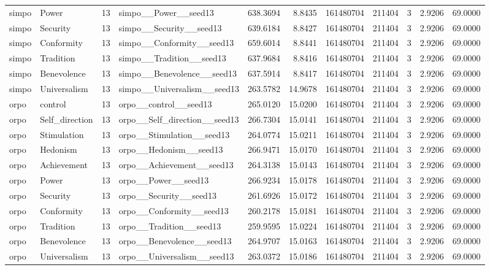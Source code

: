 \begin{tabular}{llrlrrrrrrr}
simpo & Power & 13 & simpo\_\_Power\_\_seed13 & 638.3694 & 8.8435 & 161480704 & 211404 & 3 & 2.9206 & 69.0000 \\
simpo & Security & 13 & simpo\_\_Security\_\_seed13 & 639.6184 & 8.8427 & 161480704 & 211404 & 3 & 2.9206 & 69.0000 \\
simpo & Conformity & 13 & simpo\_\_Conformity\_\_seed13 & 659.6014 & 8.8441 & 161480704 & 211404 & 3 & 2.9206 & 69.0000 \\
simpo & Tradition & 13 & simpo\_\_Tradition\_\_seed13 & 637.9684 & 8.8416 & 161480704 & 211404 & 3 & 2.9206 & 69.0000 \\
simpo & Benevolence & 13 & simpo\_\_Benevolence\_\_seed13 & 637.5914 & 8.8417 & 161480704 & 211404 & 3 & 2.9206 & 69.0000 \\
simpo & Universalism & 13 & simpo\_\_Universalism\_\_seed13 & 263.5782 & 14.9678 & 161480704 & 211404 & 3 & 2.9206 & 69.0000 \\
orpo & control & 13 & orpo\_\_control\_\_seed13 & 265.0120 & 15.0200 & 161480704 & 211404 & 3 & 2.9206 & 69.0000 \\
orpo & Self\_direction & 13 & orpo\_\_Self\_direction\_\_seed13 & 266.7304 & 15.0141 & 161480704 & 211404 & 3 & 2.9206 & 69.0000 \\
orpo & Stimulation & 13 & orpo\_\_Stimulation\_\_seed13 & 264.0774 & 15.0211 & 161480704 & 211404 & 3 & 2.9206 & 69.0000 \\
orpo & Hedonism & 13 & orpo\_\_Hedonism\_\_seed13 & 266.9471 & 15.0170 & 161480704 & 211404 & 3 & 2.9206 & 69.0000 \\
orpo & Achievement & 13 & orpo\_\_Achievement\_\_seed13 & 264.3138 & 15.0143 & 161480704 & 211404 & 3 & 2.9206 & 69.0000 \\
orpo & Power & 13 & orpo\_\_Power\_\_seed13 & 266.9234 & 15.0178 & 161480704 & 211404 & 3 & 2.9206 & 69.0000 \\
orpo & Security & 13 & orpo\_\_Security\_\_seed13 & 261.6926 & 15.0172 & 161480704 & 211404 & 3 & 2.9206 & 69.0000 \\
orpo & Conformity & 13 & orpo\_\_Conformity\_\_seed13 & 260.2178 & 15.0181 & 161480704 & 211404 & 3 & 2.9206 & 69.0000 \\
orpo & Tradition & 13 & orpo\_\_Tradition\_\_seed13 & 259.9595 & 15.0224 & 161480704 & 211404 & 3 & 2.9206 & 69.0000 \\
orpo & Benevolence & 13 & orpo\_\_Benevolence\_\_seed13 & 264.9707 & 15.0163 & 161480704 & 211404 & 3 & 2.9206 & 69.0000 \\
orpo & Universalism & 13 & orpo\_\_Universalism\_\_seed13 & 263.0372 & 15.0186 & 161480704 & 211404 & 3 & 2.9206 & 69.0000 \\

\end{tabular}
